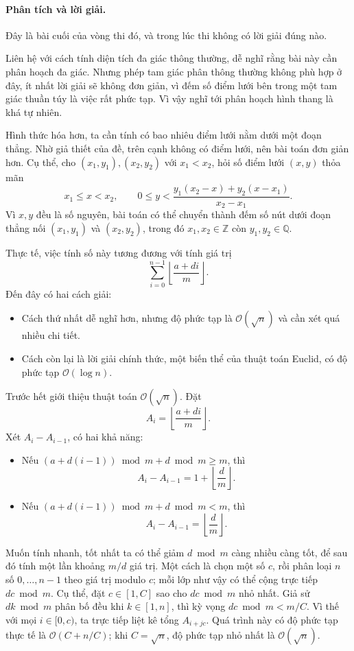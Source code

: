 \documentclass[11pt]{article}
\newcommand{\Oh}{\mathcal{O}}
\newcommand{\floor}[1]{\left\lfloor #1\right\rfloor}
\begin{document}
\paragraph{Phân tích và lời giải.}
Đây là bài cuối của vòng thi đó, và trong lúc thi không có lời giải đúng nào.

Liên hệ với cách tính diện tích đa giác thông thường, dễ nghĩ rằng bài này cần
phân hoạch đa giác. Nhưng phép tam giác phân thông thường không phù hợp ở đây,
ít nhất lời giải sẽ không đơn giản, vì đếm số điểm lưới bên trong một tam giác
thuần túy là việc rất phức tạp. Vì vậy nghĩ tới phân hoạch hình thang là khá
tự nhiên.

Hình thức hóa hơn, ta cần tính có bao nhiêu điểm lưới nằm dưới một đoạn thẳng.
Nhờ giả thiết của đề, trên cạnh không có điểm lưới, nên bài toán đơn giản hơn.
Cụ thể, cho $(x_1,y_1),(x_2,y_2)$ với $x_1<x_2$, hỏi số điểm lưới $(x,y)$
thỏa mãn
\[
  x_1\le x<x_2,\qquad
  0\le y<
  \frac{y_1(x_2-x)+y_2(x-x_1)}{x_2-x_1}.
\]
Vì $x,y$ đều là số nguyên, bài toán có thể chuyển thành đếm số nút dưới đoạn
thẳng nối $(x_1,y_1)$ và $(x_2,y_2)$, trong đó
$x_1,x_2\in\mathbb{Z}$ còn $y_1,y_2\in\mathbb{Q}$.

Thực tế, việc tính số này tương đương với tính giá trị
\[
  \sum_{i=0}^{n-1}\floor{\frac{a+di}{m}}.
\]
Đến đây có hai cách giải:
\begin{itemize}
  \item Cách thứ nhất dễ nghĩ hơn, nhưng độ phức tạp là $\Oh(\sqrt n)$ và cần
  xét quá nhiều chi tiết.
  \item Cách còn lại là lời giải chính thức, một biến thể của thuật toán
  Euclid, có độ phức tạp $\Oh(\log n)$.
\end{itemize}

Trước hết giới thiệu thuật toán $\Oh(\sqrt n)$. Đặt
\[
  A_i=\floor{\frac{a+di}{m}}.
\]
Xét $A_i-A_{i-1}$, có hai khả năng:
\begin{itemize}
  \item Nếu $(a+d(i-1))\bmod m+d\bmod m\ge m$, thì
  \[
    A_i-A_{i-1}=1+\floor{\frac{d}{m}}.
  \]
  \item Nếu $(a+d(i-1))\bmod m+d\bmod m<m$, thì
  \[
    A_i-A_{i-1}=\floor{\frac{d}{m}}.
  \]
\end{itemize}

Muốn tính nhanh, tốt nhất ta có thể giảm $d\bmod m$ càng nhiều càng tốt, để
sau đó tính một lần khoảng $m/d$ giá trị. Một cách là chọn một số $c$, rồi
phân loại $n$ số $0,\ldots,n-1$ theo giá trị modulo $c$; mỗi lớp như vậy có
thể cộng trực tiếp $dc\bmod m$. Cụ thể, đặt $c\in[1,C]$ sao cho
$dc\bmod m$ nhỏ nhất. Giả sử $dk\bmod m$ phân bố đều khi $k\in[1,n]$, thì kỳ
vọng $dc\bmod m<m/C$. Vì thế với mọi $i\in[0,c)$, ta trực tiếp liệt kê tổng
$A_{i+jc}$. Quá trình này có độ phức tạp thực tế là $\Oh(C+n/C)$; khi
$C=\sqrt n$, độ phức tạp nhỏ nhất là $\Oh(\sqrt n)$.
\end{document}
